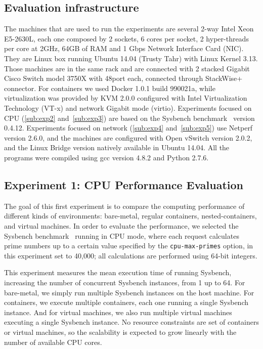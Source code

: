 \documentclass[conference]{IEEEtran}
\begin{document}
\subsection{Evaluation infrastructure}

The machines that are used to run the experiments are several 2-way Intel Xeon 
E5-2630L, each one composed by 2 sockets, 6 cores per socket, 2 hyper-threads 
per core at 2GHz, 64GB of RAM and 1 Gbps Network Interface Card (NIC). They are 
Linux box running Ubuntu 14.04 (Trusty Tahr) with Linux Kernel 3.13. Those 
machines are in the same rack and are connected with 2 stacked Gigabit Cisco 
Switch model 3750X with 48port each, connected through StackWise+ connector. For 
containers we used Docker 1.0.1 build 990021a, while virtualization was provided 
by KVM 2.0.0 configured with Intel Virtualization Technology (VT-x) and network 
Gigabit mode (virtio).
Experiments focused on CPU (\ref{sub:exp2} and~\ref{sub:exp3}) are based on the 
Sysbench benchmark~\cite{sysbench} version 0.4.12.  Experiments focused on 
network (\ref{sub:exp4} and~\ref{sub:exp5}) use Netperf version 2.6.0, and the 
machines are configured with Open vSwitch version 2.0.2, and the Linux Bridge
version natively available in Ubuntu 14.04. All the programs were compiled using 
gcc version 4.8.2 and Python 2.7.6.

\subsection{Experiment 1: CPU Performance Evaluation}
\label{sub:exp1}

The goal of this first experiment is to compare the computing performance of
different kinds of environments: bare-metal, regular containers,  
nested-containers, and virtual machines. In order to evaluate the performance, 
we selected the Sysbench benchmark~\cite{sysbench} running in CPU mode, where
each request calculates prime numbers up to a certain value specified by the
\texttt{cpu-max-primes} option, in this experiment set to 40,000; all
calculations are performed using 64-bit integers.

This experiment measures the mean execution time of running Sysbench,
increasing the number of concurrent Sysbench instances, from 1 up to 64. For
bare-metal, we simply run multiple Sysbench instances on the host machine. For
containers, we execute multiple containers, each one running a single Sysbench
instance. And for virtual machines, we also run multiple virtual machines
executing a single Sysbench instance. No resource constraints are set of
containers or virtual machines, so the scalability is expected to grow
linearly with the number of available CPU cores.
\end{document}
